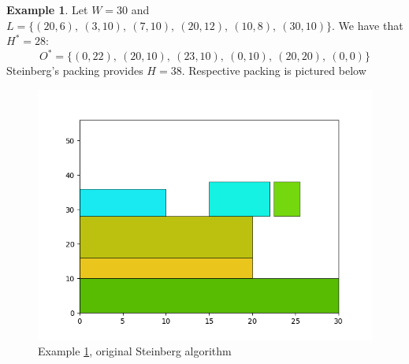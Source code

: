 \documentclass{article}
\theoremstyle{definition}
\newtheorem{example}{Example}
\theoremstyle{theorem}
\numberwithin{proposition}{section}
\begin{document}
    \begin{example}\label{ex2}
        Let $W = 30$ and $L = \{(20, 6),~(3, 10),~(7, 10),~(20, 12),~(10, 8),~(30, 10)\}$. We have that $H^{*} = 28$:
        \begin{equation*}
            O^{*} =\{(0,22),~(20,10),~(23,10),~(0,10),~(20,20),~(0,0)\}
        \end{equation*}
        Steinberg’s packing provides $H = 38$. Respective packing is pictured below
        \begin{figure}[H]
            \centering
            \includegraphics[scale=0.5]{../examples/original-2.png}
            \caption{Example \ref{ex2}, original Steinberg algorithm}
        \end{figure} 
    \end{example}
\end{document}
